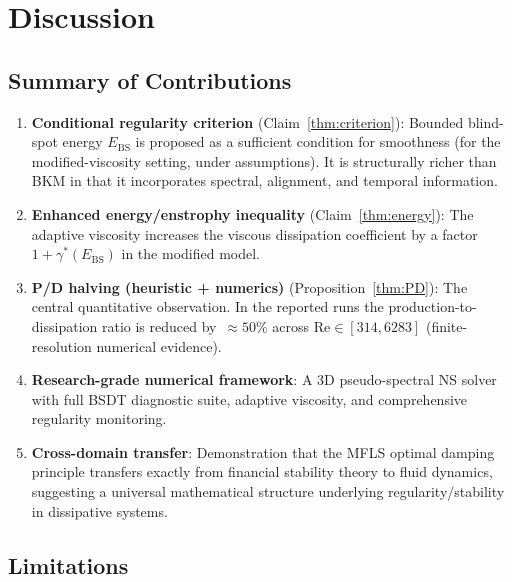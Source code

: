 \documentclass[12pt, a4paper]{article}
\newcommand{\Ebs}{E_{\mathrm{BS}}}
\newcommand{\gammastar}{\gamma^*}
\begin{document}
\section{Discussion}\label{sec:discussion}

\subsection{Summary of Contributions}

\begin{enumerate}
\item \textbf{Conditional regularity criterion} (Claim~\ref{thm:criterion}):
  Bounded blind-spot energy $\Ebs$ is proposed as a sufficient condition
  for smoothness (for the modified-viscosity setting, under assumptions).
  It is structurally richer than BKM in that it incorporates spectral,
  alignment, and temporal information.

\item \textbf{Enhanced energy/enstrophy inequality} (Claim~\ref{thm:energy}):
  The adaptive viscosity increases the viscous dissipation coefficient by a
  factor $1+\gammastar(\Ebs)$ in the modified model.

\item \textbf{P/D halving (heuristic + numerics)} (Proposition~\ref{thm:PD}):
  The central quantitative observation. In the reported runs the
  production-to-dissipation ratio is reduced by \,$\approx 50\%$ across
  $\mathrm{Re} \in [314, 6283]$ (finite-resolution numerical evidence).

\item \textbf{Research-grade numerical framework}:
  A 3D pseudo-spectral NS solver with full BSDT diagnostic suite,
  adaptive viscosity, and comprehensive regularity monitoring.

\item \textbf{Cross-domain transfer}:
  Demonstration that the MFLS optimal damping principle transfers
  exactly from financial stability theory to fluid dynamics, suggesting
  a universal mathematical structure underlying regularity/stability
  in dissipative systems.
\end{enumerate}

\subsection{Limitations}
\end{document}
